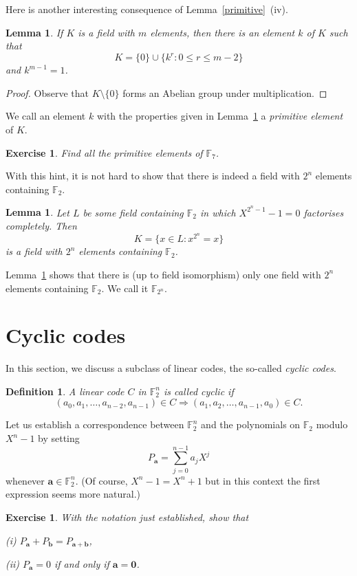 \documentclass[12pt,a4paper]{article}
\theoremstyle{plain}
\newtheorem{lemma}[theorem]{Lemma}
\newtheorem{definition}[theorem]{Definition}
\newtheorem{exercise}[theorem]{Exercise}
\theoremstyle{definition}
\begin{document}
    Here is another interesting consequence of
    Lemma~\ref{primitive}~(iv).
    \begin{lemma}
        \label{primitive field}
        If $K$ is a field with $m$ elements,
        then there is an
        element $k$ of $K$ such that
        \[K=\{0\}\cup\{k^{r}:0\leq r\leq m-2\}\]
        and $k^{m-1}=1$.
    \end{lemma}
    \begin{proof}
        Observe that $K\setminus\{0\}$ forms
        an Abelian group
        under multiplication.
    \end{proof}
    We call an element $k$ with the properties
    given in Lemma~\ref{primitive field}
    a \emph{primitive element} of $K$.
    \begin{exercise}
        Find all the primitive elements of ${\mathbb F}_{7}$.
    \end{exercise}

    With this hint, it is not hard to show that there is
    indeed a field with $2^{n}$ elements
    containing ${\mathbb F}_{2}$.
    \begin{lemma}
        \label{Galois}
        Let $L$ be some field containing
        ${\mathbb F}_{2}$ in which $X^{2^{n}-1}-1=0$
        factorises completely. Then
        \[K=\{x\in L:x^{2^{n}}=x\}\]
        is a field with $2^{n}$ elements
        containing ${\mathbb F}_{2}$.
    \end{lemma}

    Lemma~\ref{primitive field} shows that
    there is (up to field isomorphism) only one
    field with $2^{n}$ elements
    containing ${\mathbb F}_{2}$.
    We call it ${\mathbb F}_{2^{n}}$.
    \section{Cyclic codes} In this section, we
    discuss a subclass of linear codes, the
    so-called \emph{cyclic codes}.
    \begin{definition}
        A linear code $C$
        in ${\mathbb F}^{n}_{2}$
        is called \emph{cyclic} if
        \[(a_{0},a_{1},\dots,a_{n-2},a_{n-1})\in C
        \Rightarrow (a_{1},a_{2},\dots,a_{n-1},a_{0})\in C.\]
    \end{definition}
    Let us establish a correspondence between
    ${\mathbb F}^{n}_{2}$ and the polynomials
    on ${\mathbb F}_{2}$ modulo $X^{n}-1$
    by setting
    \[P_{\mathbf a}=\sum_{j=0}^{n-1}a_{j}X^{j}\]
    whenever ${\mathbf a}\in {\mathbb F}_{2}^{n}$.
    (Of course, $X^{n}-1=X^{n}+1$ but in this context
    the first expression seems more natural.)
    \begin{exercise}
        With the notation
        just established, show that

        (i) $P_{\mathbf a}+P_{\mathbf b}=P_{{\mathbf a}+{\mathbf b}}$,

        (ii) $P_{\mathbf a}=0$ if and only if ${\mathbf a}={\boldsymbol 0}$.
    \end{exercise}
\end{document}
